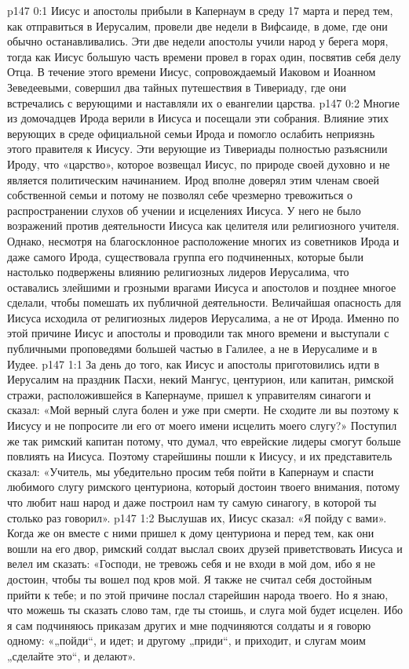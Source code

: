\author{Комиссия срединников}
\vs p147 0:1 Иисус и апостолы прибыли в Капернаум в среду 17 марта и перед тем, как отправиться в Иерусалим, провели две недели в Вифсаиде, в доме, где они обычно останавливались. Эти две недели апостолы учили народ у берега моря, тогда как Иисус большую часть времени провел в горах один, посвятив себя делу Отца. В течение этого времени Иисус, сопровождаемый Иаковом и Иоанном Зеведеевыми, совершил два тайных путешествия в Тивериаду, где они встречались с верующими и наставляли их о евангелии царства.
\vs p147 0:2 Многие из домочадцев Ирода верили в Иисуса и посещали эти собрания. Влияние этих верующих в среде официальной семьи Ирода и помогло ослабить неприязнь этого правителя к Иисусу. Эти верующие из Тивериады полностью разъяснили Ироду, что «царство», которое возвещал Иисус, по природе своей духовно и не является политическим начинанием. Ирод вполне доверял этим членам своей собственной семьи и потому не позволял себе чрезмерно тревожиться о распространении слухов об учении и исцелениях Иисуса. У него не было возражений против деятельности Иисуса как целителя или религиозного учителя. Однако, несмотря на благосклонное расположение многих из советников Ирода и даже самого Ирода, существовала группа его подчиненных, которые были настолько подвержены влиянию религиозных лидеров Иерусалима, что оставались злейшими и грозными врагами Иисуса и апостолов и позднее многое сделали, чтобы помешать их публичной деятельности. Величайшая опасность для Иисуса исходила от религиозных лидеров Иерусалима, а не от Ирода. Именно по этой причине Иисус и апостолы и проводили так много времени и выступали с публичными проповедями большей частью в Галилее, а не в Иерусалиме и в Иудее.
\vs p147 1:1 За день до того, как Иисус и апостолы приготовились идти в Иерусалим на праздник Пасхи, некий Мангус, центурион, или капитан, римской стражи, расположившейся в Капернауме, пришел к управителям синагоги и сказал: «Мой верный слуга болен и уже при смерти. Не сходите ли вы поэтому к Иисусу и не попросите ли его от моего имени исцелить моего слугу?» Поступил же так римский капитан потому, что думал, что еврейские лидеры смогут больше повлиять на Иисуса. Поэтому старейшины пошли к Иисусу, и их представитель сказал: «Учитель, мы убедительно просим тебя пойти в Капернаум и спасти любимого слугу римского центуриона, который достоин твоего внимания, потому что любит наш народ и даже построил нам ту самую синагогу, в которой ты столько раз говорил».
\vs p147 1:2 Выслушав их, Иисус сказал: «Я пойду с вами». Когда же он вместе с ними пришел к дому центуриона и перед тем, как они вошли на его двор, римский солдат выслал своих друзей приветствовать Иисуса и велел им сказать: «Господи, не тревожь себя и не входи в мой дом, ибо я не достоин, чтобы ты вошел под кров мой. Я также не считал себя достойным прийти к тебе; и по этой причине послал старейшин народа твоего. Но я знаю, что можешь ты сказать слово там, где ты стоишь, и слуга мой будет исцелен. Ибо я сам подчиняюсь приказам других и мне подчиняются солдаты и я говорю одному: «„пойди“, и идет; и другому „приди“, и приходит, и слугам моим „сделайте это“, и делают».
